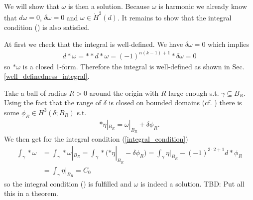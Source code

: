 \documentclass[12pt,a4paper]{article}
\theoremstyle{definition}
\newcommand{\omegabar}{\overline{\Omega}}
\begin{document}
We will show that $\omega$ is then a solution. Because $\omega$ is harmonic
we already know that $d\omega = 0$, $\delta \omega = 0$ and 
$\omega \in \mathring{H}^2(d)$. It remains to show that the integral condition
() is also satisfied.

At first we check that the integral is well-defined. We have $\delta \omega = 0$
which implies
\begin{align*}
    d * \omega = ** d*\omega = (-1)^{n(k-1)+1} *\delta \omega = 0
\end{align*}
so $*\omega$ is a closed 1-form. Therefore the integral is well-defined as shown
in Sec.\,\ref{well_definedness_integral}.

Take a ball of radius $R>0$ 
around the origin with $R$ large enough s.t. $\gamma \subseteq B_R$. 
Using the fact that the range of $\delta$ is closed on bounded domains 
(cf. \cite[Lemma 7]{picard}) there is some $\phi_R \in H^3(\delta;B_R)$ s.t.
\begin{align*}
    *\eta|_{B_R} = \omega|_{B_R} + \delta \phi_R.
\end{align*}
We then get for the integral condition (\ref{integral_condition}) 
\begin{align*}
    \int_\gamma *\omega &= \int_\gamma *\omega|_{B_R} = 
    \int_\gamma *(*\eta|_{B_R} - \delta \phi_R) = 
    \int_\gamma \eta|_{B_R} - (-1)^{3\cdot 2+1} d * \phi_R \\
    &= \int_\gamma \eta|_{B_R} = C_0
\end{align*}
so the integral condition () is fulfilled and 
$\omega$ is indeed a solution. \newline
{\color{red} TBD: Put all this in a theorem.}


\end{document}
